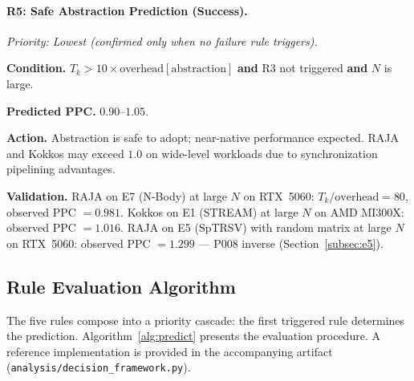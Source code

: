 \paragraph{R5: Safe Abstraction Prediction (Success).}
\textit{Priority: Lowest (confirmed only when no failure rule triggers).}

\noindent\textbf{Condition.}
$T_k > 10 \times \text{overhead}[\text{abstraction}]$ \textbf{and}
R3 not triggered \textbf{and} $N$ is large.

\noindent\textbf{Predicted PPC.} $0.90$--$1.05$.

\noindent\textbf{Action.}
Abstraction is safe to adopt; near-native performance expected. RAJA and
Kokkos may exceed $1.0$ on wide-level workloads due to synchronization
pipelining advantages.

\noindent\textbf{Validation.}
RAJA on E7 (N-Body) at large $N$ on RTX~5060: $T_k / \text{overhead} = 80$,
observed PPC $= 0.981$. Kokkos on E1 (STREAM) at large $N$ on AMD MI300X:
observed PPC $= 1.016$. RAJA on E5 (SpTRSV) with random matrix at large $N$
on RTX~5060: observed PPC $= 1.299$ --- P008 inverse
(Section~\ref{subsec:e5}).

\subsection{Rule Evaluation Algorithm}
\label{subsec:algorithm}

The five rules compose into a priority cascade: the first triggered rule
determines the prediction. Algorithm~\ref{alg:predict} presents the
evaluation procedure. A reference implementation is provided in the
accompanying artifact (\texttt{analysis/decision\_framework.py}).

